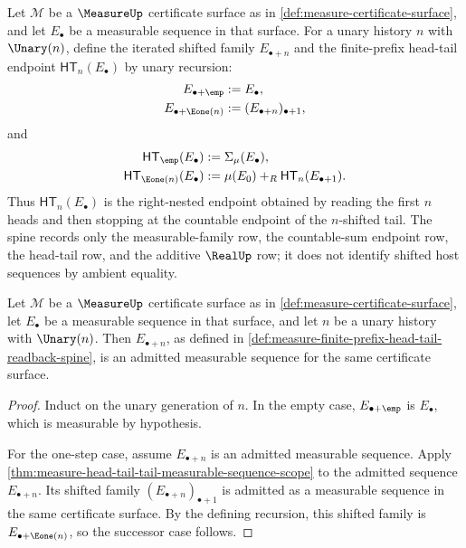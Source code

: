 \begin{definition}
\label{def:measure-finite-prefix-head-tail-readback-spine}
Let $\mathcal{M}$ be a $\MeasureUp$ certificate surface as in
\autoref{def:measure-certificate-surface}, and let $E_\bullet$ be a measurable
sequence in that surface. For a unary history $n$ with $\Unary(n)$, define the
iterated shifted family $E_{\bullet+n}$ and the finite-prefix head-tail endpoint
$\mathsf{HT}_n(E_\bullet)$ by unary recursion:
$$
\begin{aligned}
E_{\bullet+\emp} &:= E_\bullet, \\
E_{\bullet+\Eone(n)} &:= (E_{\bullet+n})_{\bullet+1},
\end{aligned}
$$
and
$$
\begin{aligned}
\mathsf{HT}_{\emp}(E_\bullet) &:= \Sigma_\mu(E_\bullet), \\
\mathsf{HT}_{\Eone(n)}(E_\bullet) &:= \mu(E_0)+_R\mathsf{HT}_n(E_{\bullet+1}).
\end{aligned}
$$
Thus $\mathsf{HT}_n(E_\bullet)$ is the right-nested endpoint obtained by
reading the first $n$ heads and then stopping at the countable endpoint of the
$n$-shifted tail. The spine records only the measurable-family row, the
countable-sum endpoint row, the head-tail row, and the additive $\RealUp$ row;
it does not identify shifted host sequences by ambient equality.
\end{definition}

\begin{lemma}
\label{lem:measure-iterated-shifted-tail-admissibility}
Let $\mathcal{M}$ be a $\MeasureUp$ certificate surface as in
\autoref{def:measure-certificate-surface}, let $E_\bullet$ be a measurable
sequence in that surface, and let $n$ be a unary history with $\Unary(n)$. Then
$E_{\bullet+n}$, as defined in
\autoref{def:measure-finite-prefix-head-tail-readback-spine}, is an admitted
measurable sequence for the same certificate surface.
\end{lemma}
\begin{proof}
Induct on the unary generation of $n$. In the empty case,
$E_{\bullet+\emp}$ is $E_\bullet$, which is measurable by hypothesis.

For the one-step case, assume $E_{\bullet+n}$ is an admitted measurable
sequence. Apply
\autoref{thm:measure-head-tail-tail-measurable-sequence-scope} to the admitted
sequence $E_{\bullet+n}$. Its shifted family
$(E_{\bullet+n})_{\bullet+1}$ is admitted as a measurable sequence in the same
certificate surface. By the defining recursion, this shifted family is
$E_{\bullet+\Eone(n)}$, so the successor case follows.
\end{proof}

